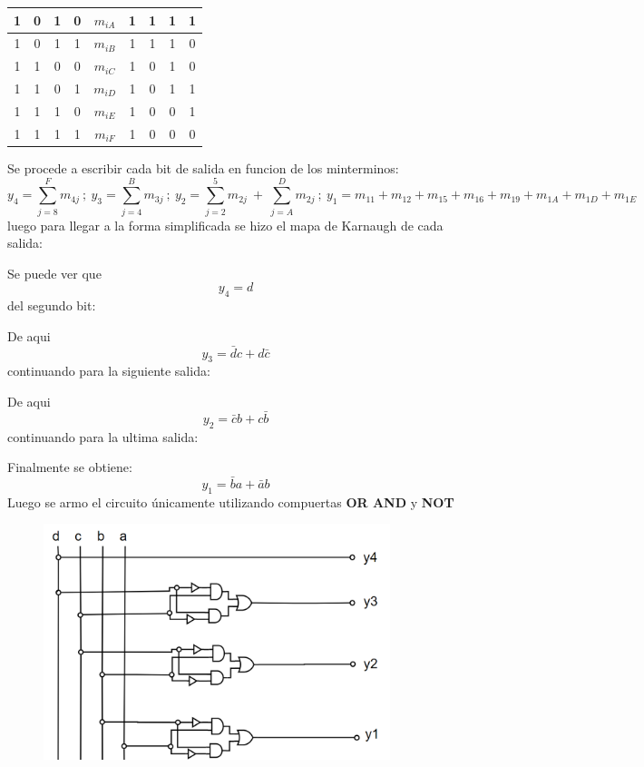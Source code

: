 \documentclass[a4paper]{article}
\begin{document}
\begin{table}[H]
\begin{tabular}{|c|c|c|c|c|c|c|c|c|}
1              & 0              & 1              & 0              & \textbf{$m_{iA}$}   & 1              & 1              & 1              & 1              \\ \hline
1              & 0              & 1              & 1              & \textbf{$m_{iB}$}   & 1              & 1              & 1              & 0              \\ \hline
1              & 1              & 0              & 0              & \textbf{$m_{iC}$}   & 1              & 0              & 1              & 0              \\ \hline
1              & 1              & 0              & 1              & \textbf{$m_{iD}$}   & 1              & 0              & 1              & 1              \\ \hline
1              & 1              & 1              & 0              & \textbf{$m_{iE}$}   & 1              & 0              & 0              & 1              \\ \hline
1              & 1              & 1              & 1              & \textbf{$m_{iF}$}   & 1              & 0              & 0              & 0              \\ \hline
\end{tabular}
\end{table}

Se procede a escribir cada bit de salida en funcion de los minterminos:
\[
	y_4 = \sum_{j=8}^{F} m_{4j}  \  ; \ y_3 = \sum_{j=4}^{B} m_{3j}\  ; \ y_2 = \sum_{j=2}^{5} m_{2j} \ + \  \sum_{j=A}^{D} m_{2j}  \  ; \  y_1=m_{11}+m_{12}+m_{15}+m_{16}+m_{19}+m_{1A}+m_{1D}+m_{1E} 
\]
luego para llegar a la forma simplificada se hizo el mapa de Karnaugh de cada salida:

Se puede ver que $$y_4 = d$$
del segundo bit:

De aqui $$y_3 = \bar{d}c+d\bar{c}$$
continuando para la siguiente salida:

De aqui $$y_2 = \bar{c}b+c\bar{b}$$
continuando para la ultima salida:

Finalmente se obtiene: $$y_1 = \bar{b}a+\bar{a}b$$
Luego se armo el circuito únicamente utilizando compuertas \textbf{OR AND } y \textbf{NOT}

\begin{figure}[H]
	\centering
	\includegraphics[width=0.9\textwidth]{Circuito3.PNG}
	\label{fig:circ3}
\end{figure}
\end{document}
